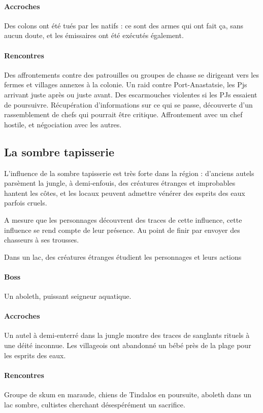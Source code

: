 \documentclass[10pt,a4paper]{book}
\begin{document}
\paragraph{Accroches} Des colons ont été tués par les natifs : ce sont des armes qui ont fait ça, sans aucun doute, et les émissaires ont été exécutés également. 
\paragraph{Rencontres} Des affrontements contre des patrouilles ou groupes de chasse se dirigeant vers les fermes et villages annexes à la colonie. Un raid contre Port-Anastatsie, les Pjs arrivant juste après ou juste avant. Des escarmouches violentes si les PJs essaient de poursuivre. Récupération d'informations sur ce qui se passe, découverte d'un rassemblement de chefs qui pourrait être critique. Affrontement avec un chef hostile, et négociation avec les autres.
\subsection{La sombre tapisserie}
L'influence de la sombre tapisserie est très forte dans la région : d'anciens autels parsèment la jungle, à demi-enfouis, des créatures étranges et improbables hantent les côtes, et les locaux peuvent admettre vénérer des esprits des eaux parfois cruels.

A mesure que les personnages découvrent des traces de cette influence, cette influence se rend compte de leur présence. Au point de finir par envoyer des chasseurs à ses trousses.

Dans un lac, des créatures étranges étudient les personnages et leurs actions
\paragraph{Boss}Un aboleth, puissant seigneur aquatique.
\paragraph{Accroches} Un autel à demi-enterré dans la jungle montre des traces de sanglants rituels à une déité inconnue. Les villageois ont abandonné un bébé près de la plage pour les esprits des eaux.
\paragraph{Rencontres} Groupe de skum en maraude, chiens de Tindalos en poursuite, aboleth dans un lac sombre, cultistes cherchant désespérément un sacrifice.
\end{document}

